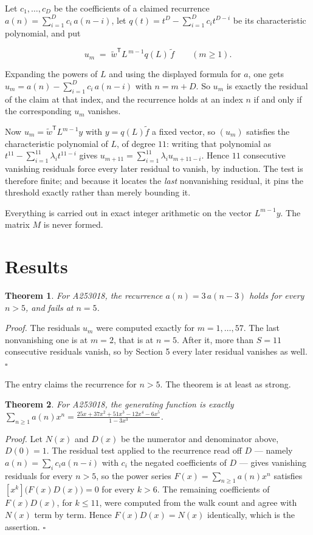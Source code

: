 \documentclass[11pt]{article}
\newtheorem{theorem}{Theorem}
\theoremstyle{definition}
\begin{document}
Let $c_1,\dots,c_D$ be the coefficients of a claimed recurrence $a(n) = \sum_{i=1}^{D} c_i\,a(n-i)$, let $q(t) = t^{D} - \sum_{i=1}^{D} c_i t^{D-i}$ be its characteristic polynomial, and put

\[u_m \;=\; \tilde w^{\mathsf T} L^{\,m-1} q(L)\,\tilde f \qquad (m \ge 1).\]

Expanding the powers of $L$ and using the displayed formula for $a$, one gets $u_m = a(n) - \sum_{i=1}^{D} c_i\,a(n-i)$ with $n = m + D$. So $u_m$ is exactly the residual of the claim at that index, and the recurrence holds at an index $n$ if and only if the corresponding $u_m$ vanishes.

Now $u_m = \tilde w^{\mathsf T} L^{m-1} y$ with $y = q(L)\tilde f$ a fixed vector, so $(u_m)$ satisfies the characteristic polynomial of $L$, of degree $11$: writing that polynomial as $t^{11} - \sum_{i=1}^{11} \lambda_i t^{11-i}$ gives $u_{m+11} = \sum_{i=1}^{11} \lambda_i u_{m+11-i}$. Hence $11$ consecutive vanishing residuals force every later residual to vanish, by induction. The test is therefore finite; and because it locates the {\itshape last} nonvanishing residual, it pins the threshold exactly rather than merely bounding it.

Everything is carried out in exact integer arithmetic on the vector $L^{m-1}y$. The matrix $M$ is never formed.

\section{Results}

\begin{theorem} For A253018, the recurrence $a(n) = 3\,a(n-3)$ holds for every $n > 5$, and fails at $n = 5$.\end{theorem}

{\itshape Proof.} The residuals $u_m$ were computed exactly for $m = 1,\dots,57$. The last nonvanishing one is at $m = 2$, that is at $n = 5$. After it, more than $S = 11$ consecutive residuals vanish, so by Section 5 every later residual vanishes as well. $\square$

The entry claims the recurrence for $n > 5$. The theorem is at least as strong.

\begin{theorem} For A253018, the generating function is exactly $\sum_{n\ge 1} a(n)x^n = \frac{25x + 37x^{2} + 51x^{3} - 12x^{4} - 6x^{5}}{1 - 3x^{3}}$.\end{theorem}

{\itshape Proof.} Let $N(x)$ and $D(x)$ be the numerator and denominator above, $D(0)=1$. The residual test applied to the recurrence read off $D$ --- namely $a(n) = \sum_i c_i a(n-i)$ with $c_i$ the negated coefficients of $D$ --- gives vanishing residuals for every $n > 5$, so the power series $F(x)=\sum_{n\ge 1}a(n)x^n$ satisfies $[x^k]\bigl(F(x)D(x)\bigr) = 0$ for every $k > 6$. The remaining coefficients of $F(x)D(x)$, for $k \le 11$, were computed from the walk count and agree with $N(x)$ term by term. Hence $F(x)D(x) = N(x)$ identically, which is the assertion. $\square$
\end{document}
